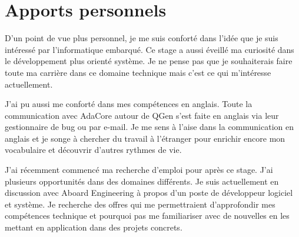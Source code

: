 \section*{Apports personnels}
D'un point de vue plus personnel, je me suis conforté dans l'idée que je suis intéressé par l'informatique embarqué.
Ce stage a aussi éveillé ma curiosité dans le développement plus orienté système.
Je ne pense pas que je souhaiterais faire toute ma carrière dans ce domaine technique mais c'est ce qui m'intéresse actuellement.

J'ai pu aussi me conforté dans mes compétences en anglais. Toute la communication avec AdaCore autour de QGen s'est faite
en anglais via leur gestionnaire de bug ou par e-mail. Je me sens à l'aise dans la communication en anglais et je songe
à chercher du travail à l'étranger pour enrichir encore mon vocabulaire et découvrir d'autres rythmes de vie.

J'ai récemment commencé ma recherche d'emploi pour après ce stage. J'ai plusieurs opportunités dans des domaines différents.
Je suis actuellement en discussion avec Aboard Engineering à propos d'un poste de développeur logiciel et système.
Je recherche des offres qui me permettraient d'approfondir mes compétences technique et pourquoi pas me familiariser
avec de nouvelles en les mettant en application dans des projets concrets.


